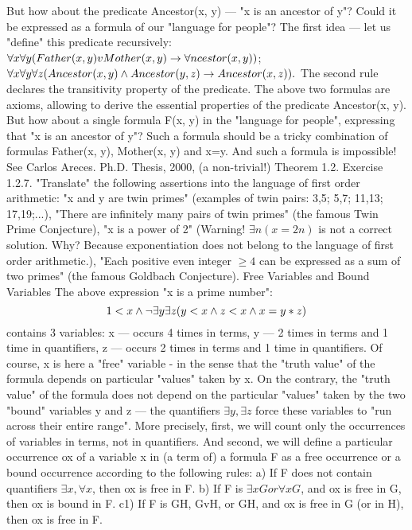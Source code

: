 But how about the predicate Ancestor(x, y) --- "x is an ancestor of y"? Could it be expressed as a formula
of our "language for people"? The first idea --- let us "define" this predicate recursively:
\(\forall x\forall y(Father(x, y) v Mother(x, y)\rightarrow \forall ncestor(x, y))\);
\(\forall x\forall y\forall z(Ancestor(x, y) \wedge  Ancestor(y, z)\rightarrow Ancestor(x, z)).\)
The second rule declares the transitivity property of the predicate. The above two formulas are axioms,
allowing to derive the essential properties of the predicate Ancestor(x, y). But how about a single formula
F(x, y) in the "language for people", expressing that "x is an ancestor of y"? Such a formula should be a
tricky combination of formulas Father(x, y), Mother(x, y) and x=y. And such a formula is impossible! See
Carlos Areces. Ph.D. Thesis, 2000, (a non-trivial!) Theorem 1.2.
Exercise 1.2.7. "Translate" the following assertions into the language of first order arithmetic:
"x and y are twin primes" (examples of twin pairs: 3,5; 5,7; 11,13; 17,19;...),
"There are infinitely many pairs of twin primes" (the famous Twin Prime Conjecture),
"x is a power of 2" (Warning! \(\exists n(x=2n)\) is not a correct solution. Why? Because exponentiation does not
belong to the language of first order arithmetic.),
"Each positive even integer \(\geq4\) can be expressed as a sum of two primes"
(the famous Goldbach Conjecture).
Free Variables and Bound Variables
The above expression "x is a prime number":
\[1<x \wedge  \neg \exists y\exists z(y<x \wedge  z<x \wedge  x=y*z)\]
contains 3 variables: x --- occurs 4 times in terms, y --- 2 times in terms and 1 time in quantifiers, z --- occurs
2 times in terms and 1 time in quantifiers. Of course, x is here a "free" variable - in the sense that the
"truth value" of the formula depends on particular "values" taken by x. On the contrary, the "truth value"
of the formula does not depend on the particular "values" taken by the two "bound" variables y and z ---
the quantifiers \(\exists y, \exists z\) force these variables to "run across their entire range".
More precisely, first, we will count only the occurrences of variables in terms, not in quantifiers. And
second, we will define a particular occurrence ox of a variable x in (a term of) a formula F as a free
occurrence or a bound occurrence according to the following rules:
a) If F does not contain quantifiers \(\exists x, \forall x\), then ox is free in F.
b) If F is \(\exists xG or \forall xG\), and ox is free in G, then ox is bound in F.
c1) If F is G\AND H, GvH, or G\IMPLIES H, and ox is free in G (or in H), then ox is free in F.
